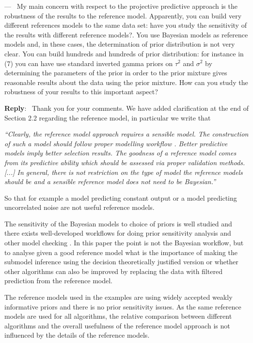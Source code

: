 \documentclass[11pt]{article}
\newcounter{reviewer}
\newcounter{point}[reviewer]
\renewcommand{\thepoint}{P\,\thereviewer.\arabic{point}}
\newenvironment{point}
   {\refstepcounter{point} \bigskip \noindent {\textbf{Reviewer~Point~\thepoint} } ---\ }
   {\par }
\newenvironment{reply}
   {\medskip \noindent \begin{sf}\textbf{Reply}:\  }
   {\medskip \end{sf}}
\begin{document}
\begin{point}
My main concern with respect to the projective predictive approach is the robustness of the results to the reference model. Apparently, you can build very different references models to the same data set: have you study the sensitivity of the results with different reference models?. You use Bayesian models as reference models and, in these cases, the determination of prior distribution is not very clear. You can build hundreds and hundreds of prior distribution: for instance in (7) you can have use standard inverted gamma priors on $\tau^2$ and $\sigma^2$ by determining the parameters of the prior in order to the prior mixture gives reasonable results about the data using the prior mixture. How can you study the robustness of your results to this important aspect?
\end{point}

\begin{reply}
Thank you for your comments. We have added clarification at the end of Section 2.2 regarding the reference model, in particular we write that

\vspace{0.5cm}
\textit{
``Clearly, the reference model approach requires a sensible model. The construction of such a model should follow proper modelling workflow \citep[see, e.g.][]{gelman2020bayesian}. Better predictive models imply better selection results. The goodness of a reference model comes from its predictive ability which should be assessed via proper validation methods. [...] In general, there is not restriction on the type of model the reference models should be and a sensible reference model does not need to be Bayesian.''
}
\vspace{0.5cm}

So that for example a model predicting constant output or a model predicting uncorrelated noise are not useful reference models.

The sensitivity of the Bayesian models to choice of priors is well studied and there exists well-developed workflows for doing prior sensitivity analysis and other model checking \citep[see, e.g.][]{gelman2020bayesian}. In this paper the point is not the Bayesian workflow, but to analyse given a good reference model what is the importance of making the submodel inference using the decision theoretically justified version or whether other algorithms can also be improved by replacing the data with filtered prediction from the reference model. 

The reference models used in the examples are using widely accepted weakly informative priors and there is no prior sensitivity issues. As the same reference models are used for all algorithms, the relative comparison between different algorithms and the overall usefulness of the reference model approach is not influenced by the details of the reference models.
\end{reply}
\end{document}
